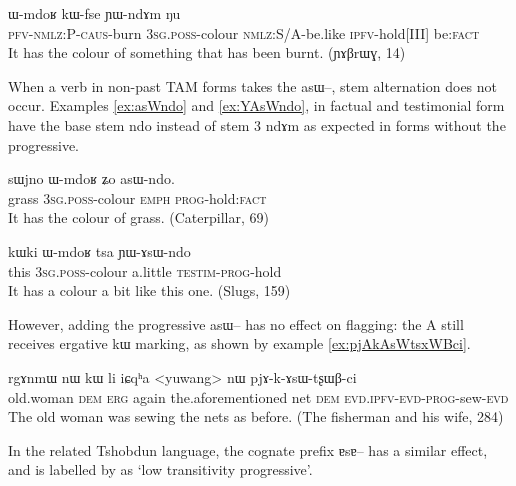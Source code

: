 \documentclass[oldfontcommands,oneside,a4paper,11pt]{article}
\newcommand{\ipa}[1]{{\phon \mbox{#1}}} %
\begin{document}
\begin{exe}
\ex \label{ex:YWndAm}
\gll \ipa{kɤ-kɤ-sɯ-ɕke} 	\ipa{ɯ-mdoʁ} 	\ipa{kɯ-fse} 	\ipa{ɲɯ-ndɤm} 		\ipa{ŋu} \\
\textsc{pfv-nmlz:P-caus}-burn \textsc{3sg.poss}-colour \textsc{nmlz:S/A}-be.like \textsc{ipfv}-hold[III] be:\textsc{fact} \\
\glt  It has the colour of something that has been burnt. (\ipa{ɲɤβrɯɣ}, 14)
\end{exe}

When a verb in non-past TAM forms takes the \ipa{asɯ--}, stem alternation does not occur. Examples \ref{ex:asWndo} and \ref{ex:YAsWndo}, in factual and testimonial form have the base stem \ipa{ndo} instead of stem 3 \ipa{ndɤm} as expected in forms without the progressive.


\begin{exe}
\ex \label{ex:asWndo}
\gll
\ipa{sɯjno} 	\ipa{ɯ-mdoʁ} 	\ipa{ʑo} 	\ipa{asɯ-ndo.} \\
grass \textsc{3sg.poss}-colour \textsc{emph} \textsc{prog}-hold:\textsc{fact} \\
\glt It has the colour of grass. (Caterpillar, 69)
\end{exe}


\begin{exe}
\ex \label{ex:YAsWndo}
\gll
\ipa{kɯki} 	\ipa{ɯ-mdoʁ} 	\ipa{tsa} 	\ipa{ɲɯ-ɤsɯ-ndo} \\
this  \textsc{3sg.poss}-colour  a.little \textsc{testim-prog}-hold \\
\glt It has a colour a bit like this one. (Slugs, 159)
\end{exe}

However, adding the progressive \ipa{asɯ--} has no effect on flagging: the A still receives ergative \ipa{kɯ} marking, as shown by example \ref{ex:pjAkAsWtsxWBci}.

\begin{exe}
\ex \label{ex:pjAkAsWtsxWBci}
\gll
\ipa{rgɤnmɯ}  	\ipa{nɯ}  	\ipa{kɯ}  	\ipa{li}  	\ipa{iɕqʰa}  	<yuwang>	\ipa{nɯ}  	\ipa{pjɤ-k-ɤsɯ-tʂɯβ-ci}  		\\
old.woman \textsc{dem} \textsc{erg} again the.aforementioned net \textsc{dem} \textsc{evd.ipfv-evd-prog}-sew-\textsc{evd} \\
\glt The old woman was sewing the nets as before. (The fisherman and his wife, 284)
\end{exe}


In the related Tshobdun language, the cognate prefix \ipa{ɐsɐ--} has a similar effect, and is labelled by \citet{jackson03caodeng} as `low transitivity progressive'.
\end{document}

